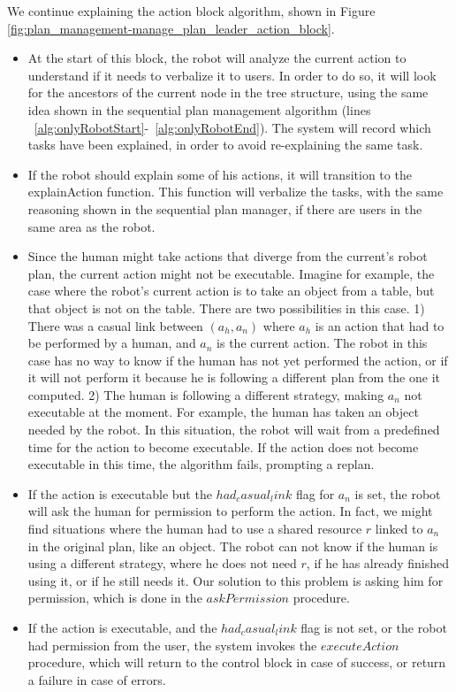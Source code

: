 We continue explaining the action block algorithm, shown in Figure \ref{fig:plan_management-manage_plan_leader_action_block}.
\begin{itemize}
\item At the start of this block, the robot will analyze the current action to understand if it needs to verbalize it to users. In order to do so, it will look for the ancestors of the current node in the tree structure, using the same idea shown in the sequential plan management algorithm (lines ~\ref{alg:onlyRobotStart}-~\ref{alg:onlyRobotEnd}). The system will record which tasks have been explained, in order to avoid re-explaining the same task.
\item If the robot should explain some of his actions, it will transition to the explainAction function. This function will verbalize the tasks, with the same reasoning shown in the sequential plan manager, if there are users in the same area as the robot.
\item Since the human might take actions that diverge from the current's robot plan, the current action might not be executable. Imagine for example, the case where the robot's current action is to take an object from a table, but that object is not on the table. There are two possibilities in this case. 1) There was a casual link between $(a_h,a_n)$ where $a_h$ is an action that had to be performed by a human, and $a_n$ is the current action. The robot in this case has no way to know if the human has not yet performed the action, or if it will not perform it because he is following a different plan from the one it computed. 2) The human is following a different strategy, making $a_n$ not executable at the moment. For example, the human has taken an object needed by the robot. In this situation, the robot will wait from a predefined time for the action to become executable. If the action does not become executable in this time, the algorithm fails, prompting a replan.
\item If the action is executable but the $had_casual_link$ flag for $a_n$ is set, the robot will ask the human for permission to perform the action. In fact, we might find situations where the human had to use a shared resource $r$ linked to $a_n$ in the original plan, like an object. The robot can not know if the human is using a different strategy, where he does not need $r$, if he has already finished using it, or if he still needs it. Our solution to this problem is asking him for permission, which is done in the $askPermission$ procedure. 
\item If the action is executable, and the $had_casual_link$ flag is not set, or the robot had permission from the user, the system invokes the $executeAction$ procedure, which will return to the control block in case of success, or return a failure in case of errors. 
\end{itemize}


